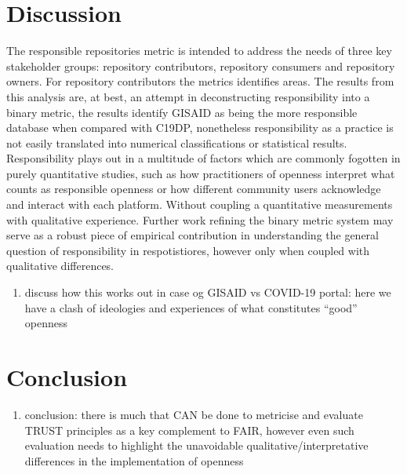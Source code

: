 \documentclass{article}
\providecommand{\tightlist}{%
  \setlength{\itemsep}{0pt}\setlength{\parskip}{0pt}}
\begin{document}
\hypertarget{discussion}{%
\section{Discussion}\label{discussion}}

The responsible repositories metric is intended to address the needs of
three key stakeholder groups: repository contributors, repository
consumers and repository owners. For repository contributors the metrics
identifies areas. The results from this analysis are, at best, an
attempt in deconstructing responsibility into a binary metric, the
results identify GISAID as being the more responsible database when
compared with C19DP, nonetheless responsibility as a practice is not
easily translated into numerical classifications or statistical results.
Responsibility plays out in a multitude of factors which are commonly
fogotten in purely quantitative studies, such as how practitioners of
openness interpret what counts as responsible openness or how different
community users acknowledge and interact with each platform. Without
coupling a quantitative measurements with qualitative experience.
Further work refining the binary metric system may serve as a robust
piece of empirical contribution in understanding the general question of
responsibility in respotistiores, however only when coupled with
qualitative differences.

\begin{enumerate}
\def\labelenumi{(\arabic{enumi})}
\setcounter{enumi}{4}
\tightlist
\item
  discuss how this works out in case og GISAID vs COVID-19 portal: here
  we have a clash of ideologies and experiences of what constitutes
  ``good'' openness
\end{enumerate}

\hypertarget{conclusion}{%
\section{Conclusion}\label{conclusion}}

\begin{enumerate}
\def\labelenumi{(\arabic{enumi})}
\setcounter{enumi}{5}
\tightlist
\item
  conclusion: there is much that CAN be done to metricise and evaluate
  TRUST principles as a key complement to FAIR, however even such
  evaluation needs to highlight the unavoidable
  qualitative/interpretative differences in the implementation of
  openness
\end{enumerate}
\end{document}
